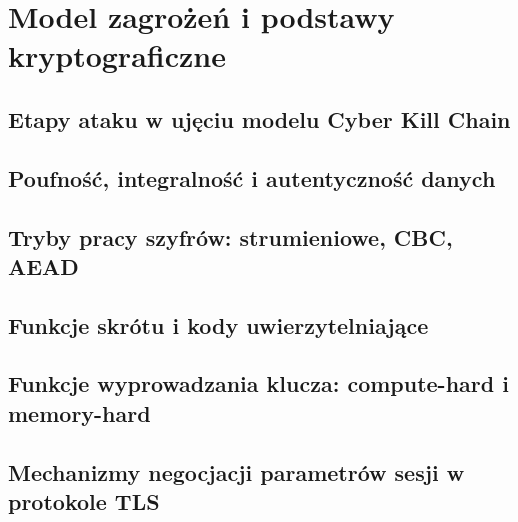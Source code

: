 \chapter{Model zagrożeń i podstawy kryptograficzne}\label{ch:podstawy}
\section{Etapy ataku w ujęciu modelu Cyber Kill Chain}\label{sec:killchain}
\section{Poufność, integralność i autentyczność danych}\label{sec:cia}
\section{Tryby pracy szyfrów: strumieniowe, CBC, AEAD}\label{sec:tryby}
\section{Funkcje skrótu i kody uwierzytelniające}\label{sec:skroty}
\section{Funkcje wyprowadzania klucza: compute-hard i memory-hard}\label{sec:kdf}
\section{Mechanizmy negocjacji parametrów sesji w protokole TLS}\label{sec:tls}
